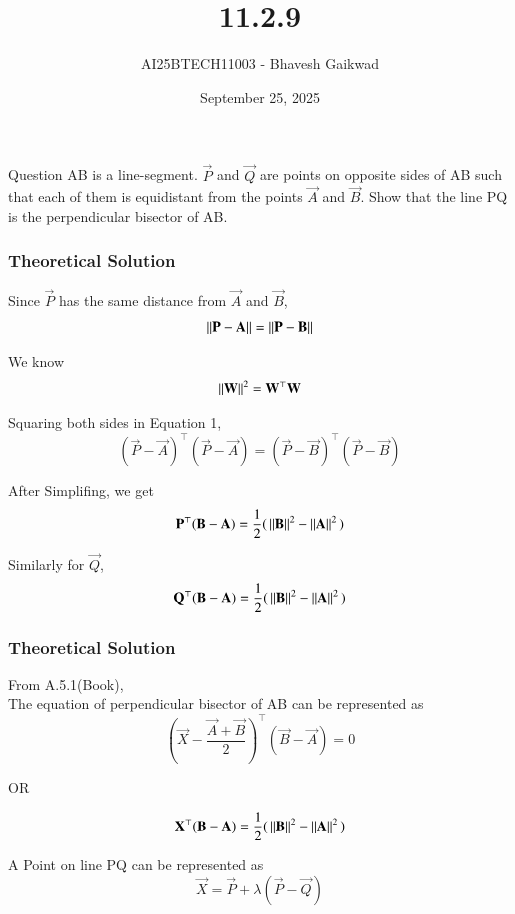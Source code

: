 \documentclass{beamer}
\title
{11.2.9}
\date{September 25, 2025}
\author 
{AI25BTECH11003 - Bhavesh Gaikwad}
\begin{document}
\frame{\titlepage}
\begin{frame}{Question}
 AB is a line-segment. $\vec{P}$ and $\vec{Q}$ are points on opposite sides of AB such that each of them is equidistant from the points $\vec{A}$ and $\vec{B}$. Show that the line PQ is the perpendicular bisector of AB.
\end{frame}


\begin{frame}[fragile]
    \frametitle{Theoretical Solution}
Since $\vec{P}$ has the same distance from $\vec{A}$ and $\vec{B}$,
\begin{equation}
    \left\lVert\mathbf{P}-\mathbf{A}\right\rVert = \left\lVert\mathbf{P}-\mathbf{B}\right\rVert
\end{equation}

We know
\begin{equation}
 \left\lVert\mathbf{W}\right\rVert^2 = {\mathbf{W}^\top\mathbf{W}}   
\end{equation}

Squaring both sides in Equation 1,
\begin{equation}
(\vec{P}-\vec{A})^\top(\vec{P}-\vec{A}) = (\vec{P}-\vec{B})^\top(\vec{P}-\vec{B})
\end{equation}

After Simplifing, we get
\begin{equation}
    \mathbf{P}^\top(\mathbf{B}-\mathbf{A}) = \dfrac{1}{2}(\, \left\lVert\mathbf{B}\right\rVert^2 - \left\lVert\mathbf{A}\right\rVert^2 \,)
\end{equation}

Similarly for $\vec{Q}$,
\begin{equation}
     \mathbf{Q}^\top(\mathbf{B}-\mathbf{A}) = \dfrac{1}{2}(\, \left\lVert\mathbf{B}\right\rVert^2 - \left\lVert\mathbf{A}\right\rVert^2 \,)
\end{equation}
\end{frame}


\begin{frame}[fragile]
    \frametitle{Theoretical Solution}
From A.5.1(Book),\\
The equation of perpendicular bisector of AB can be represented as
\begin{equation}
    \left( \vec{X} - \dfrac{\vec{A}+\vec{B}}{2} \right)^\top(\vec{B}-\vec{A}) = 0
\end{equation}


\begin{center}
    OR
\end{center}


\begin{equation}
    \mathbf{X}^\top(\mathbf{B}-\mathbf{A}) = \dfrac{1}{2}(\, \left\lVert\mathbf{B}\right\rVert^2 - \left\lVert\mathbf{A}\right\rVert^2 \,)
\end{equation}

\bigskip

A Point on line PQ can be represented as
\begin{equation}
    \vec{X} = \vec{P} + \lambda(\vec{P}-\vec{Q})
\end{equation}
\end{frame}
\end{document}
